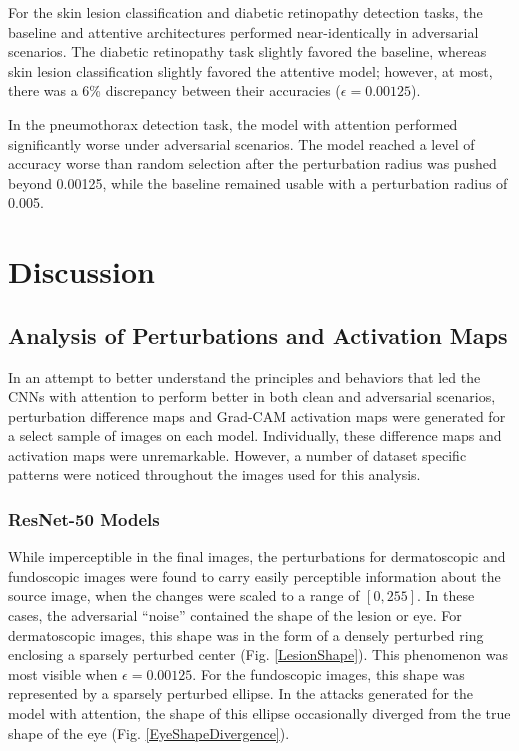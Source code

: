 \documentclass[10pt,twocolumn,letterpaper]{article}
\begin{document}
      For the skin lesion classification and diabetic retinopathy detection tasks, the baseline and attentive architectures performed near-identically in adversarial scenarios. The diabetic retinopathy task slightly favored the baseline, whereas skin lesion classification slightly favored the attentive model; however, at most, there was a 6\% discrepancy between their accuracies ($\epsilon = 0.00125$).
      
      In the pneumothorax detection task, the model with attention performed significantly worse under adversarial scenarios. The model reached a level of accuracy worse than random selection after the perturbation radius was pushed beyond 0.00125, while the baseline remained usable with a perturbation radius of 0.005.

  \section{Discussion}
    \subsection{Analysis of Perturbations and Activation Maps}
      In an attempt to better understand the principles and behaviors that led the CNNs with attention to perform better in both clean and adversarial scenarios, perturbation difference maps and Grad-CAM activation maps were generated for a select sample of images on each model. Individually, these difference maps and activation maps were unremarkable. However, a number of dataset specific patterns were noticed throughout the images used for this analysis.
      \subsubsection{ResNet-50 Models}
        While imperceptible in the final images, the perturbations for dermatoscopic and fundoscopic images were found to carry easily perceptible information about the source image, when the changes were scaled to a range of $[0,255]$. In these cases, the adversarial ``noise'' contained the shape of the lesion or eye. For dermatoscopic images, this shape was in the form of a densely perturbed ring enclosing a sparsely perturbed center (Fig. \ref{LesionShape}). This phenomenon was most visible when $\epsilon=0.00125$. For the fundoscopic images, this shape was represented by a sparsely perturbed ellipse. In the attacks generated for the model with attention, the shape of this ellipse occasionally diverged from the true shape of the eye (Fig. \ref{EyeShapeDivergence}).
\end{document}
